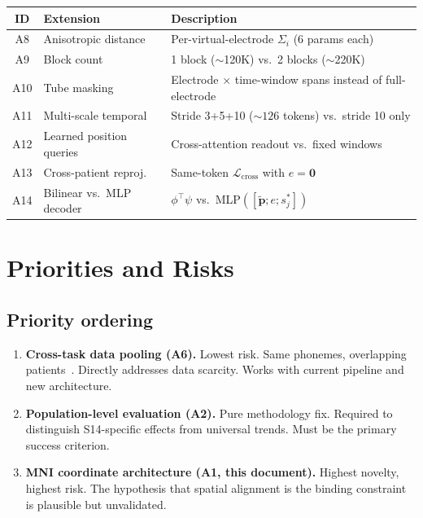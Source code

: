 \documentclass[11pt,letterpaper]{article}
\newcommand{\bfp}{\mathbf{p}}
\begin{document}
\begin{table}[ht!]\centering\small
\begin{tabular}{@{}clp{6.5cm}@{}}
\toprule
\textbf{ID} & \textbf{Extension} & \textbf{Description} \\
\midrule
A8 & Anisotropic distance & Per-virtual-electrode $\Sigma_i$ (6 params each) \\
A9 & Block count & 1 block (${\sim}$120K) vs.\ 2 blocks (${\sim}$220K) \\
A10 & Tube masking & Electrode $\times$ time-window spans instead of full-electrode \\
A11 & Multi-scale temporal & Stride 3+5+10 (${\sim}126$ tokens) vs.\ stride 10 only \\
A12 & Learned position queries & Cross-attention readout vs.\ fixed windows \\
A13 & Cross-patient reproj.\ & Same-token $\mathcal{L}_{\text{cross}}$ with $e{=}\mathbf{0}$ \\
A14 & Bilinear vs.\ MLP decoder & $\phi^\top\psi$ vs.\ MLP$([\tilde{\bfp}; e; s_j^*])$ \\
\bottomrule
\end{tabular}
\end{table}



\section{Priorities and Risks}\label{sec:priorities}

\subsection{Priority ordering}

\begin{enumerate}[leftmargin=2em]
\item \textbf{Cross-task data pooling (A6).} Lowest risk. Same phonemes, overlapping patients~\cite{duraivel2025}. Directly addresses data scarcity. Works with current pipeline and new architecture.

\item \textbf{Population-level evaluation (A2).} Pure methodology fix. Required to distinguish S14-specific effects from universal trends. Must be the primary success criterion.

\item \textbf{MNI coordinate architecture (A1, this document).} Highest novelty, highest risk. The hypothesis that spatial alignment is the binding constraint is plausible but unvalidated.
\end{enumerate}
\end{document}
